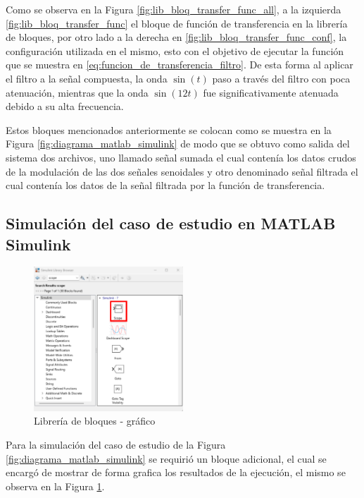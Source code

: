 Como se observa en la Figura \ref{fig:lib_bloq_transfer_func_all}, a la izquierda \ref{fig:lib_bloq_transfer_func} el bloque de función de transferencia en la librería de bloques, por otro lado a la derecha en \ref{fig:lib_bloq_transfer_func_conf},  la configuración utilizada en el mismo, esto con el objetivo de ejecutar la función que se muestra en \ref{eq:funcion_de_transferencia_filtro}. De esta forma al aplicar el filtro a la señal compuesta,  la onda $\sin(t)$ paso a través del filtro con poca atenuación, mientras que la onda $\sin(12t)$ fue significativamente atenuada debido a su  alta frecuencia.

Estos bloques mencionados anteriormente se colocan como se muestra en la Figura \ref{fig:diagrama_matlab_simulink} de modo que se obtuvo como salida del sistema dos archivos, uno llamado señal sumada el cual contenía los datos crudos de la modulación de las dos señales senoidales y otro denominado señal filtrada el cual contenía los datos de la señal filtrada por la función de transferencia.

\newpage

\subsection{Simulación del caso de estudio en MATLAB Simulink}\label{subsec:simulacion_caso_de_estudio}

\begin{figure}[h!]
    \centering
    \includegraphics[width=0.5\textwidth]{fig/especifico_2/CASO_ESTUDIO_FILTRO/scope_0.pdf}
    \caption{Librería de bloques - gráfico}
    \label{fig:lib_bloq_graph}
\end{figure}

Para la simulación del caso de estudio de la Figura \ref{fig:diagrama_matlab_simulink} se requirió un bloque adicional, el cual se encargó de mostrar de forma grafica los resultados de la ejecución, el mismo se observa en la Figura \ref{fig:lib_bloq_graph}.

